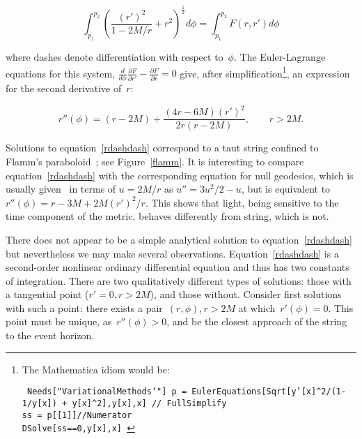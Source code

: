 \documentclass[review]{elsarticle}
\begin{document}

\begin{equation}
  \int_{p_1}^{p_2}\left(\frac{\left(r'\right)^2}{1-2M/r} + r^2\right)^\frac{1}{2}d\phi=
  \int_{p_1}^{p_2}F\left(r,r'\right)d\phi
\end{equation}

\noindent where dashes denote differentiation with respect to~$\phi$.  The
Euler-Lagrange equations for this system,
$\frac{d}{d\phi}\frac{\partial F}{\partial r'}-\frac{\partial
  F}{\partial r}=0$ give, after simplification\footnote{The Mathematica
  idiom would be:

\noindent
{\tt
Needs["VariationalMethods`"]\\
p = EulerEquations[Sqrt[y'[x]\^{}2/(1-1/y[x]) + y[x]\^{}2],y[x],x] // FullSimplify\\
ss = p[[1]]//Numerator\\
DSolve[ss==0,y[x],x]
}}, an expression for the second derivative of~$r$:

\begin{equation}\label{rdashdash}
  r''\left(\phi\right) =
  (r-2M) + \frac{(4r-6M)\left(r'\right)^2}{2r\left(r-2M\right)},\qquad r>2M.
\end{equation}

\noindent 
Solutions to equation~\ref{rdashdash} correspond to a taut string
confined to Flamm's paraboloid~\cite{flamm1916}; see
Figure~\ref{flamm}.  It is interesting to compare
equation~\ref{rdashdash} with the corresponding equation for null
geodesics, which is usually given~\cite{wald} in terms of $u=2M/r$ as
$u''=3u^2/2-u$, but is equivalent
to~$r''\left(\phi\right)=r-3M+2M\left(r'\right)^2/r$.  This shows that
light, being sensitive to the time component of the metric, behaves
differently from string, which is not.

There does not appear to be a simple analytical solution to
equation~\ref{rdashdash} but nevertheless we may make several
observations.  Equation~\ref{rdashdash} is a second-order nonlinear
ordinary differential equation and thus has two constants of
integration.  There are two qualitatively different types of
solutions: those with a tangential point ($r'=0,r>2M$), and those
without.  Consider first solutions with such a point: there exists a
pair~$\left(r,\phi\right), r>2M$ at which~$r'(\phi)=0$.  This point
must be unique, as~$r''(\phi)>0$, and be the closest approach of the
string to the event horizon.
\end{document}
